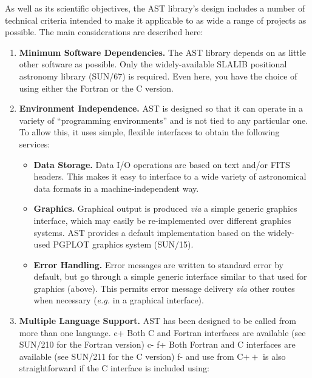 \documentclass[twoside,11pt]{article}
\newcommand{\xref}[3]{#1}
\begin{document}
As well as its scientific objectives, the AST library's design
includes a number of technical criteria intended to make it applicable
to as wide a range of projects as possible. The main considerations
are described here:

\begin{enumerate}
\item {\bf{Minimum Software Dependencies.}}
The AST library depends on as little other software as possible. Only
the widely-available SLALIB positional astronomy library
(\xref{SUN/67}{sun67}{}) is required. Even here, you have the choice
of using either the Fortran or the C version.

\item {\bf{Environment Independence.}}
AST is designed so that it can operate in a variety of ``programming
environments'' and is not tied to any particular one. To allow this,
it uses simple, flexible interfaces to obtain the following services:

\begin{itemize}
\item {\bf{Data Storage.}} Data I/O operations are based on text
and/or FITS headers. This makes it easy to interface to a wide variety
of astronomical data formats in a machine-independent way.

\item {\bf{Graphics.}} Graphical output is produced {\em{via}} a
simple generic graphics interface, which may easily be re-implemented
over different graphics systems. AST provides a default implementation
based on the widely-used PGPLOT graphics system
(\xref{SUN/15}{sun15}{}).

\item {\bf{Error Handling.}} Error messages are written to standard
error by default, but go through a simple generic interface similar to
that used for graphics (above). This permits error message delivery
{\em{via}} other routes when necessary ({\em{e.g.}} in a graphical
interface).
\end{itemize}

\item {\bf{Multiple Language Support.}}
AST has been designed to be called from more than one language.
c+
Both C and Fortran interfaces are available (see
\xref{SUN/210}{sun210}{} for the Fortran version)
c-
f+
Both Fortran and C interfaces are available (see
\xref{SUN/211}{sun211}{} for the C version)
f-
and use from C$++$ is also straightforward if the C interface is
included using:


\end{enumerate}
\end{document}
